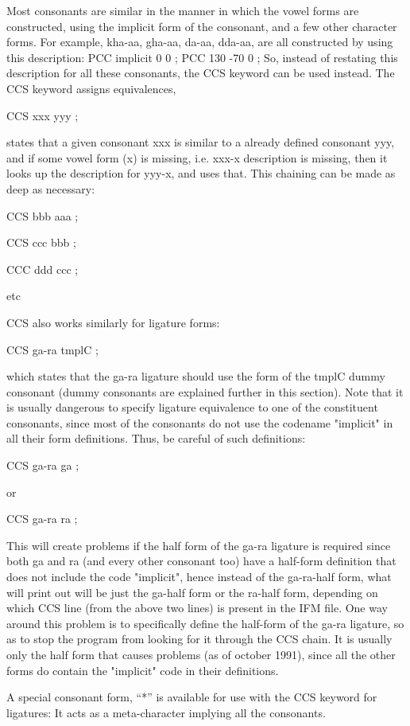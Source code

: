 \documentclass[11pt]{article}
\begin{document}
Most consonants are similar in the manner in which the vowel forms are
constructed, using the implicit form of the consonant, and a few other
character forms.
For example, kha-aa, gha-aa, da-aa, dda-aa, are all constructed by using
this description:
PCC implicit 0 0 ; PCC 130 -70 0 ;
So, instead of restating this description for all these consonants, the
CCS keyword can be used instead.
The CCS keyword assigns equivalences, 

CCS xxx yyy ;

states that a given consonant
xxx is similar to a already defined consonant yyy, and  if some vowel
form (x) is missing, i.e. xxx-x description is missing, then it looks up
the description for yyy-x, and uses that.
This chaining can be made as deep as necessary:

CCS bbb aaa ;

CCS ccc bbb ;

CCC ddd ccc ;

etc

CCS also works similarly for ligature forms:

CCS ga-ra tmplC ;

which states that the ga-ra ligature should use the form of the tmplC
dummy consonant (dummy consonants are explained further in this section).
Note that it is usually dangerous to specify ligature equivalence to one
of the constituent consonants, since most of the consonants do not use the
codename "implicit" in all their form definitions.
Thus, be careful of such definitions:

CCS ga-ra ga ;

or

CCS ga-ra ra ;

This will create problems if the half form of the ga-ra ligature is
required since both ga and ra (and every other consonant too)
have a half-form definition that does not include the code "implicit",
hence instead of the ga-ra-half form, what will print out will
be just the ga-half form or the ra-half form, depending on which
CCS line (from the above two lines) is present in the IFM file.
One way around this problem is to specifically define the half-form of
the ga-ra ligature, so as to stop the program from looking for it 
through the CCS chain.
It is usually only the half form that causes problems (as of october 1991),
since all the other forms do contain the "implicit" code in their
definitions.

A special consonant form, ``*'' is available for use with the CCS
keyword for ligatures:
It acts as a meta-character implying all the consonants.
\end{document}
